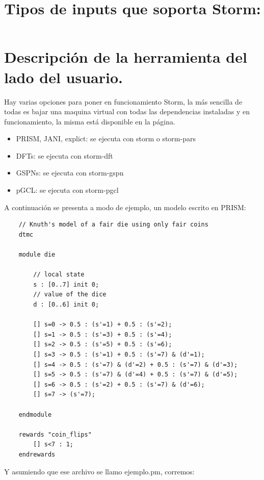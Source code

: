 \documentclass[11pt]{article}
\begin{document}
\section{Descripci\'on de la herramienta del lado del usuario.}

Hay varias opciones para poner en funcionamiento Storm, la m\'as sencilla de todas es bajar una maquina virtual con todas las dependencias instaladas y en funcionamiento, la misma est\'a disponible en la p\'agina.


\title{Tipos de inputs que soporta Storm:}

\begin{itemize}
	\item PRISM, JANI, explict: se ejecuta con storm o storm-pars
	
	\item DFTs: se ejecuta con storm-dft

	\item GSPNs: se ejecuta con storm-gspn

	\item pGCL: se ejecuta con storm-pgcl
\end{itemize} 

A continuaci\'on se presenta a modo de ejemplo, un modelo escrito en PRISM:

\begin{verbatim}
	// Knuth's model of a fair die using only fair coins
	dtmc
	
	module die
	
		// local state
		s : [0..7] init 0;
		// value of the dice
		d : [0..6] init 0;
		
		[] s=0 -> 0.5 : (s'=1) + 0.5 : (s'=2);
		[] s=1 -> 0.5 : (s'=3) + 0.5 : (s'=4);
		[] s=2 -> 0.5 : (s'=5) + 0.5 : (s'=6);
		[] s=3 -> 0.5 : (s'=1) + 0.5 : (s'=7) & (d'=1);
		[] s=4 -> 0.5 : (s'=7) & (d'=2) + 0.5 : (s'=7) & (d'=3);
		[] s=5 -> 0.5 : (s'=7) & (d'=4) + 0.5 : (s'=7) & (d'=5);
		[] s=6 -> 0.5 : (s'=2) + 0.5 : (s'=7) & (d'=6);
		[] s=7 -> (s'=7);
		
	endmodule
	
	rewards "coin_flips"
		[] s<7 : 1;
	endrewards
\end{verbatim}

Y asumiendo que ese archivo se llamo ejemplo.pm, corremos:
\end{document}
